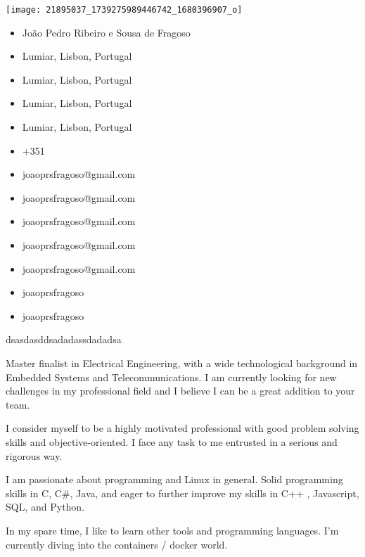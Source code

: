 \documentclass[11pt, a4paper]{cv}
\begin{document}

\begin{minipage}{0.3\linewidth}
    \texttt{[image: 21895037\_1739275989446742\_1680396907\_o]}
    \label{fig:joaoprsfragoso}
\end{minipage}\hfil
\begin{minipage}{0.55\linewidth}
\begin{itemize}
	\item \faUser \space João Pedro Ribeiro e Sousa de Fragoso
	\item \faHome \space Lumiar, Lisbon, Portugal
	\item \faFlag \space Lumiar, Lisbon, Portugal
	\item \faLocationArrow \space Lumiar, Lisbon, Portugal
	\item \faMapMarker \space Lumiar, Lisbon, Portugal
	\item \faMobile \space +351 
	\item \faEnvelopeO \space joaoprsfragoso@gmail.com
	\item \faEnvelope \space joaoprsfragoso@gmail.com
	\item \faEnvelopeSquare \space joaoprsfragoso@gmail.com
	\item \faGoogle \space joaoprsfragoso@gmail.com
	\item \faInbox \space joaoprsfragoso@gmail.com
	\item \faLinkedinSquare \space joaoprsfragoso
	\item \faSkype \space joaoprsfragoso
\end{itemize}
\end{minipage}


dsasdasddsadadassdadadsa

\aboutme
{

	\faQuoteLeft \space Master finalist in Electrical Engineering, with a wide technological background in Embedded Systems and Telecommunications. I am currently looking for new challenges in my professional field and I believe I can be a great addition to your team.

	I consider myself to be a highly motivated professional with good problem solving skills and objective-oriented. I face any task to me entrusted in a serious and rigorous way.

	I am passionate about programming and Linux in general. Solid programming skills in C, C\#, Java, and eager to further improve my skills in C++ , Javascript, SQL, and Python. 

	In my spare time, I like to learn other tools and programming languages. I'm currently diving into the containers / docker world. \faQuoteRight

}
\end{document}
